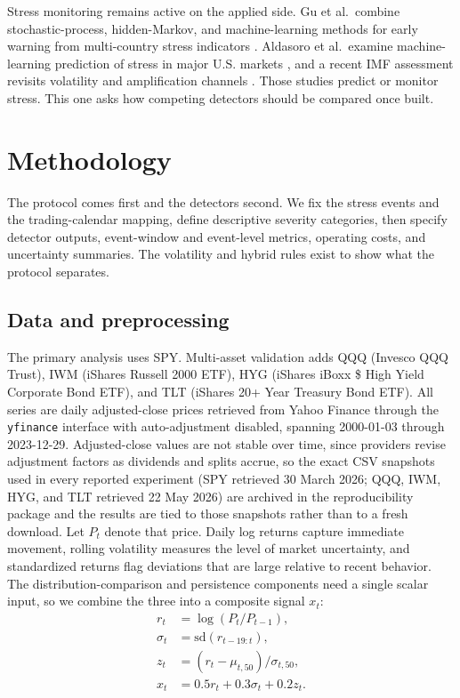 \documentclass[pdflatex,sn-mathphys-num,iicol]{sn-jnl}
\begin{document}
Stress monitoring remains active on the applied side. Gu et al.\ combine stochastic-process, hidden-Markov, and machine-learning methods for early warning from multi-country stress indicators \cite{gu2024}. Aldasoro et al.\ examine machine-learning prediction of stress in major U.S. markets \cite{aldasoro2025}, and a recent IMF assessment revisits volatility and amplification channels \cite{imf2026}. Those studies predict or monitor stress. This one asks how competing detectors should be compared once built.

\section{Methodology}
\label{sec:method}
The protocol comes first and the detectors second. We fix the stress events and the trading-calendar mapping, define descriptive severity categories, then specify detector outputs, event-window and event-level metrics, operating costs, and uncertainty summaries. The volatility and hybrid rules exist to show what the protocol separates.

\subsection{Data and preprocessing}
The primary analysis uses SPY. Multi-asset validation adds QQQ (Invesco QQQ Trust), IWM (iShares Russell 2000 ETF), HYG (iShares iBoxx \$ High Yield Corporate Bond ETF), and TLT (iShares 20+ Year Treasury Bond ETF). All series are daily adjusted-close prices retrieved from Yahoo Finance through the \texttt{yfinance} interface with auto-adjustment disabled, spanning 2000-01-03 through 2023-12-29. Adjusted-close values are not stable over time, since providers revise adjustment factors as dividends and splits accrue, so the exact CSV snapshots used in every reported experiment (SPY retrieved 30 March 2026; QQQ, IWM, HYG, and TLT retrieved 22 May 2026) are archived in the reproducibility package and the results are tied to those snapshots rather than to a fresh download. Let $P_t$ denote that price. Daily log returns capture immediate movement, rolling volatility measures the level of market uncertainty, and standardized returns flag deviations that are large relative to recent behavior. The distribution-comparison and persistence components need a single scalar input, so we combine the three into a composite signal $x_t$:
\begin{align}
r_t &= \log(P_t/P_{t-1}),\\
\sigma_t &= \mathrm{sd}(r_{t-19:t}),\\
z_t &= (r_t-\mu_{t,50})/\sigma_{t,50},\\
x_t &= 0.5r_t + 0.3\sigma_t + 0.2z_t.
\end{align}
\end{document}
